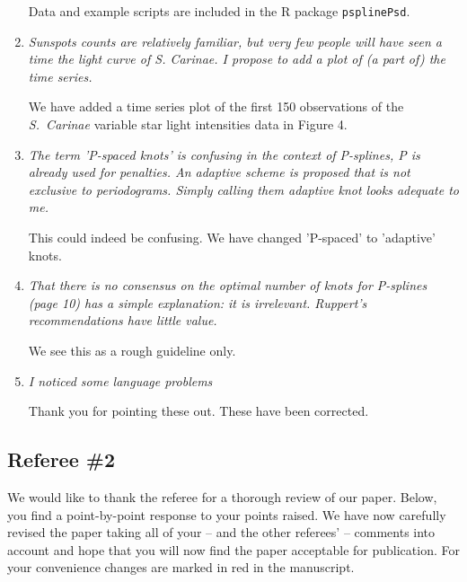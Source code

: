 \documentclass{scrartcl}
\newcommand{\refereeQuote}{\textit }
\newcommand{\response}{}
\begin{document}
\begin{enumerate}
\response{Data and example scripts are included in the R package {\tt psplinePsd}.}\bigskip


\item
\refereeQuote{Sunspots counts are relatively familiar, but very few people will have seen a time the light curve of S. Carinae. I propose to add a plot of (a part of) the time series.}\smallskip

\response{We have added a time series plot of the first 150 observations of the \textit{S.\ Carinae} variable star light intensities data in Figure 4}.\bigskip


\item
\refereeQuote{
The term 'P-spaced knots' is confusing in the context of P-splines, P is already used for penalties. An adaptive scheme is proposed that is not exclusive to periodograms. Simply calling them adaptive knot looks adequate to me.}\smallskip

\response{ This could indeed be confusing. We have changed 'P-spaced' to 'adaptive' knots.}\bigskip

\item
\refereeQuote{That there is no consensus on the optimal number of knots for P-splines (page 10) has a simple explanation: it is irrelevant. Ruppert's recommendations have little value.}\smallskip

\response{We see this as a rough guideline only.}\bigskip


\item
\refereeQuote{I noticed some language problems}\smallskip

\response{Thank you for pointing these out. These have been corrected.}


\end{enumerate}

\newpage

\subsection*{Referee \#2}


\response{We would like to thank the referee for a thorough review of our paper. Below, you find a point-by-point response to your points raised. We have now carefully revised the paper taking all of your -- and the other referees' -- comments into account and hope that you will now find the paper acceptable for publication. For your convenience changes are marked in red in the manuscript.
} \smallskip
\end{document}
